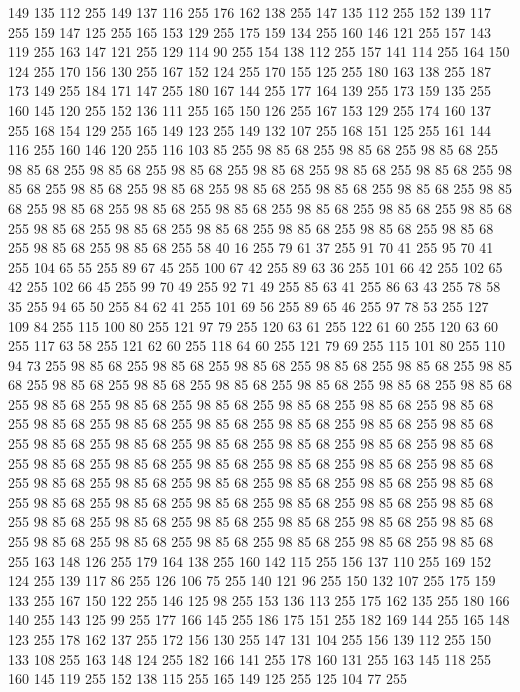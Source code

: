 149 135 112 255 149 137 116 255 176 162 138 255 147 135 112 255 152 139 117 255 159 147 125 255 165 153 129 255 175 159 134 255 160 146 121 255 157 143 119 255 163 147 121 255 129 114 90 255 154 138 112 255 157 141 114 255 164 150 124 255 170 156 130 255 167 152 124 255 170 155 125 255 180 163 138 255 187 173 149 255 184 171 147 255 180 167 144 255 177 164 139 255 173 159 135 255 160 145 120 255 152 136 111 255 165 150 126 255 167 153 129 255 174 160 137 255 168 154 129 255 165 149 123 255 149 132 107 255 168 151 125 255 161 144 116 255 160 146 120 255 116 103 85 255 98 85 68 255 98 85 68 255 98 85 68 255 98 85 68 255 98 85 68 255 98 85 68 255 98 85 68 255 98 85 68 255 98 85 68 255 98 85 68 255 98 85 68 255 98 85 68 255 98 85 68 255 98 85 68 255 98 85 68 255 98 85 68 255 98 85 68 255 98 85 68 255 98 85 68 255 98 85 68 255 98 85 68 255 98 85 68 255 98 85 68 255 98 85 68 255 98 85 68 255 98 85 68 255 98 85 68 255 98 85 68 255
98 85 68 255 98 85 68 255 58 40 16 255 79 61 37 255 91 70 41 255 95 70 41 255 104 65 55 255 89 67 45 255 100 67 42 255 89 63 36 255 101 66 42 255 102 65 42 255 102 66 45 255 99 70 49 255 92 71 49 255 85 63 41 255 86 63 43 255 78 58 35 255 94 65 50 255 84 62 41 255 101 69 56 255 89 65 46 255 97 78 53 255 127 109 84 255 115 100 80 255 121 97 79 255 120 63 61 255 122 61 60 255 120 63 60 255 117 63 58 255 121 62 60 255 118 64 60 255 121 79 69 255 115 101 80 255 110 94 73 255 98 85 68 255 98 85 68 255 98 85 68 255 98 85 68 255 98 85 68 255 98 85 68 255 98 85 68 255 98 85 68 255 98 85 68 255 98 85 68 255 98 85 68 255 98 85 68 255 98 85 68 255 98 85 68 255 98 85 68 255 98 85 68 255 98 85 68 255 98 85 68 255 98 85 68 255 98 85 68 255 98 85 68 255 98 85 68 255 98 85 68 255 98 85 68 255 98 85 68 255 98 85 68 255 98 85 68 255 98 85 68 255 98 85 68 255
98 85 68 255 98 85 68 255 98 85 68 255 98 85 68 255 98 85 68 255 98 85 68 255 98 85 68 255 98 85 68 255 98 85 68 255 98 85 68 255 98 85 68 255 98 85 68 255 98 85 68 255 98 85 68 255 98 85 68 255 98 85 68 255 98 85 68 255 98 85 68 255 98 85 68 255 98 85 68 255 98 85 68 255 98 85 68 255 98 85 68 255 98 85 68 255 98 85 68 255 98 85 68 255 98 85 68 255 98 85 68 255 98 85 68 255 98 85 68 255 98 85 68 255 163 148 126 255 179 164 138 255 160 142 115 255 156 137 110 255 169 152 124 255 139 117 86 255 126 106 75 255 140 121 96 255 150 132 107 255 175 159 133 255 167 150 122 255 146 125 98 255 153 136 113 255 175 162 135 255 180 166 140 255 143 125 99 255 177 166 145 255 186 175 151 255 182 169 144 255 165 148 123 255 178 162 137 255 172 156 130 255 147 131 104 255 156 139 112 255 150 133 108 255 163 148 124 255 182 166 141 255 178 160 131 255 163 145 118 255 160 145 119 255 152 138 115 255 165 149 125 255 125 104 77 255
